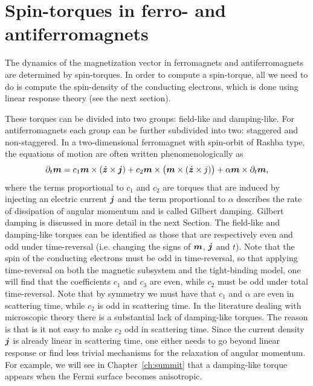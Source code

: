 \section{Spin-torques in ferro- and antiferromagnets}
The dynamics of the magnetization vector in ferromagnets and antiferromagnets are determined by spin-torques. In order to compute a spin-torque, all we need to do is compute the spin-density of the conducting electrons, which is done using linear response theory (see the next section).  

 These torques can be divided into two groups: field-like and damping-like. For antiferromagnets each group can be further subdivided into two: staggered and non-staggered. In a two-dimensional ferromagnet with spin-orbit of Rashba type, the equations of motion are often written phenomenologically as
\begin{equation}
    \partial_t \boldsymbol{m} = c_1 \boldsymbol{m}\times (\hat{\boldsymbol{z}}\times\boldsymbol{j}) + c_2 \boldsymbol{m}\times\big(\boldsymbol{m}\times (\hat{\boldsymbol{z}}\times{j})\big) + \alpha \boldsymbol{m}\times \partial_t \boldsymbol{m},
    \label{eq:sd:ferro}
\end{equation}
where the terms proportional to $c_1$ and $c_2$ are torques that are induced by injecting an electric current $\boldsymbol{j}$ and the term proportional to $\alpha$ describes the rate of dissipation of angular momentum and is called Gilbert damping. Gilbert damping is discussed in more detail in the next Section. The field-like and damping-like torques can be identified as those that are respectively even and odd under time-reversal (i.e. changing the signs of $\boldsymbol{m}$, $\boldsymbol{j}$ and $t$). Note that the spin of the conducting electrons must be odd in time-reversal, so that applying time-reversal on both the magnetic subsystem and the tight-binding model, one will find that the coefficients $c_1$ and $c_3$ are even, while $c_2$ must be odd under total time-reversal. Note that by symmetry we must have that $c_1$ and $\alpha$ are even in scattering time, while $c_2$ is odd in scattering time. In the literature dealing with microscopic theory there is a substantial lack of damping-like torques. The reason is that is it not easy to make $c_2$ odd in scattering time. Since the current density $\boldsymbol{j}$ is already linear in scattering time, one either needs to go beyond linear response or find less trivial mechanisms for the relaxation of angular momentum. For example, we will see in Chapter~\ref{ch:summit} that a damping-like torque appears when the Fermi surface becomes anisotropic. 

